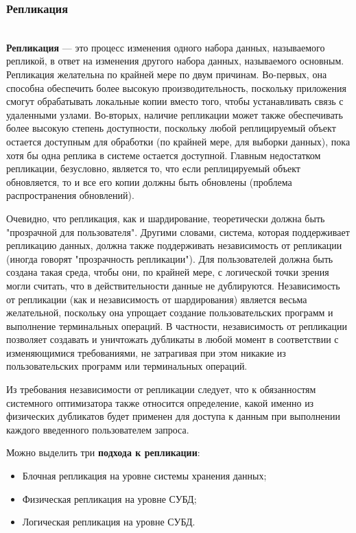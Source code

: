 \subsubsection{Репликация} ~\\
\textbf{Репликация} — это процесс изменения одного набора данных, называемого репликой, в ответ на изменения другого
набора данных, называемого основным. Репликация желательна по крайней мере по двум причинам. Во-первых, она способна
обеспечить более высокую производительность, поскольку приложения смогут обрабатывать локальные копии вместо того,
чтобы устанавливать связь с удаленными узлами. Во-вторых, наличие репликации может также обеспечивать более высокую
степень доступности, поскольку любой реплицируемый объект остается доступным для обработки (по крайней мере, для выборки
данных), пока хотя бы одна реплика в системе остается доступной. Главным недостатком репликации, безусловно, является
то, что если реплицируемый объект обновляется, то и все его копии должны быть обновлены (проблема распространения
обновлений).

Очевидно, что репликация, как и шардирование, теоретически должна быть "прозрачной для пользователя". Другими словами,
система, которая поддерживает репликацию данных, должна также поддерживать независимость от репликации (иногда говорят
"прозрачность репликации"). Для пользователей должна быть создана такая среда, чтобы они, по крайней мере, с логической
точки зрения могли считать, что в действительности данные не дублируются. Независимость от репликации (как и
независимость от шардирования) является весьма желательной, поскольку она упрощает создание пользовательских программ и
выполнение терминальных операций. В частности, независимость от репликации позволяет создавать и уничтожать дубликаты в
любой момент в соответствии с изменяющимися требованиями, не затрагивая при этом никакие из пользовательских программ
или терминальных операций.

Из требования независимости от репликации следует, что к обязанностям системного оптимизатора также относится
определение, какой именно из физических дубликатов будет применен для доступа к данным при выполнении каждого
введенного пользователем запроса. \autocite{IntroBD2014}

Можно выделить три \textbf{подхода к репликации}:
\begin{itemize}
    \item Блочная репликация на уровне системы хранения данных;
    \item Физическая репликация на уровне СУБД;
    \item Логическая репликация на уровне СУБД.
\end{itemize}

